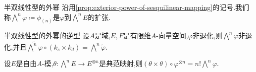 \begin{definition}{半双线性型的外幂}{}
	沿用\cref{prop:exterior-power-of-sesquilinear-mapping}的记号.我们称$\bigwedge\limits^{n}\varphi\coloneq\phi_{\left(n\right)}$是$\varphi$到$\bigwedge^{n}E$的扩张.
\end{definition}

\begin{proposition}{半双线性型的外幂的逆型}{}
	设$A$是域,$E,F$是有限维$A$-向量空间,$\varphi$非退化,则$\bigwedge\limits^{n}\varphi$非退化,并且$\widetilde{\bigwedge\limits^{n}\varphi}\circ\left(k_{s}\times k_{d}\right)=\bigwedge\limits^{n}\tilde{\varphi}$.
\end{proposition}

\begin{remark}{}{}
	设$E$是自由$A$-模,$\theta:\bigwedge\limits^{n}E\to E^{\otimes n}$是典范映射,则$\left(\theta\times\theta\right)\circ\varphi^{\otimes n}=n!\bigwedge\limits^{n}\varphi$.
\end{remark}
